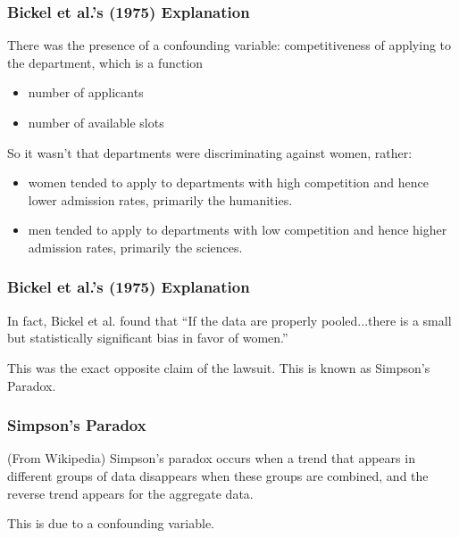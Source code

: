 \documentclass[handout]{beamer}
\newcommand{\blue}[1]{\textcolor{blue2}{#1}}
\begin{document}
\begin{frame}
\frametitle{Bickel et al.'s (1975) Explanation}

There was the presence of a confounding variable: \blue{competitiveness} of applying to the department, which is a function
\begin{itemize}
\item number of applicants
\item number of available slots
\end{itemize}

\vskip 0.5cm

\pause So it wasn't that departments were discriminating against women, rather:
\begin{itemize}
\pause \item women tended to apply to departments with high competition and hence lower admission rates, primarily the humanities.
\pause \item men tended to apply to departments with low competition and hence higher admission rates, primarily the sciences.
\end{itemize}

\end{frame}


\begin{frame}
\frametitle{Bickel et al.'s (1975) Explanation}

In fact, Bickel et al. found that ``If the data are properly \blue{pooled}...there is a small but statistically significant bias in \blue{favor of women}.''

\vskip 0.5cm

\pause This was the exact \blue{opposite} claim of the lawsuit.  This is known as \blue{Simpson's Paradox}.  

\end{frame}



\begin{frame}
\frametitle{Simpson's Paradox}

(From Wikipedia) Simpson's paradox occurs when a trend that appears in different groups of data disappears when these groups are combined, and the \blue{reverse trend} appears for the aggregate data.  

\vspace{0.25in}

\pause This is due to a confounding variable.

\end{frame}
\end{document}
